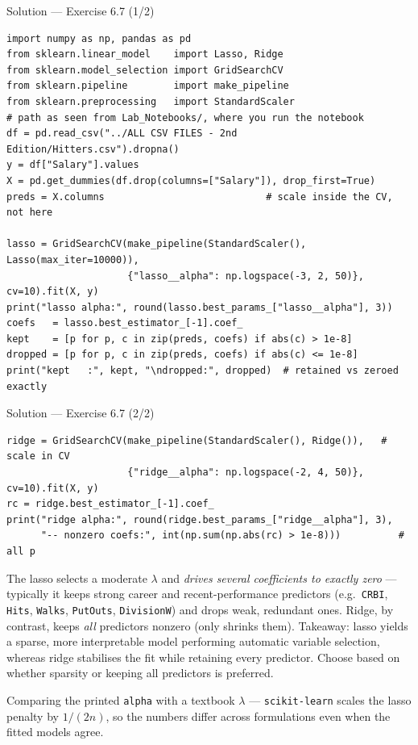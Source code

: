 \documentclass[aspectratio=169,11pt]{beamer}
\begin{document}
\begin{frame}[fragile]{Solution --- Exercise 6.7 (1/2)}
  \begin{lstlisting}
import numpy as np, pandas as pd
from sklearn.linear_model    import Lasso, Ridge
from sklearn.model_selection import GridSearchCV
from sklearn.pipeline        import make_pipeline
from sklearn.preprocessing   import StandardScaler
# path as seen from Lab_Notebooks/, where you run the notebook
df = pd.read_csv("../ALL CSV FILES - 2nd Edition/Hitters.csv").dropna()
y = df["Salary"].values
X = pd.get_dummies(df.drop(columns=["Salary"]), drop_first=True)
preds = X.columns                            # scale inside the CV, not here

lasso = GridSearchCV(make_pipeline(StandardScaler(), Lasso(max_iter=10000)),
                     {"lasso__alpha": np.logspace(-3, 2, 50)}, cv=10).fit(X, y)
print("lasso alpha:", round(lasso.best_params_["lasso__alpha"], 3))
coefs   = lasso.best_estimator_[-1].coef_
kept    = [p for p, c in zip(preds, coefs) if abs(c) > 1e-8]
dropped = [p for p, c in zip(preds, coefs) if abs(c) <= 1e-8]
print("kept   :", kept, "\ndropped:", dropped)  # retained vs zeroed exactly
  \end{lstlisting}
\end{frame}

\begin{frame}[fragile]{Solution --- Exercise 6.7 (2/2)}
  \begin{lstlisting}
ridge = GridSearchCV(make_pipeline(StandardScaler(), Ridge()),   # scale in CV
                     {"ridge__alpha": np.logspace(-2, 4, 50)}, cv=10).fit(X, y)
rc = ridge.best_estimator_[-1].coef_
print("ridge alpha:", round(ridge.best_params_["ridge__alpha"], 3),
      "-- nonzero coefs:", int(np.sum(np.abs(rc) > 1e-8)))          # all p
  \end{lstlisting}
  \begin{solutionbox}
    The lasso selects a moderate $\lambda$ and \emph{drives several
    coefficients to exactly zero} --- typically it keeps strong career
    and recent-performance predictors (e.g.\ \texttt{CRBI},
    \texttt{Hits}, \texttt{Walks}, \texttt{PutOuts},
    \texttt{DivisionW}) and drops weak, redundant ones. Ridge, by
    contrast, keeps \emph{all} predictors nonzero (only shrinks them).
    Takeaway: lasso yields a sparse, more interpretable model performing
    automatic variable selection, whereas ridge stabilises the fit while
    retaining every predictor. Choose based on whether sparsity or
    keeping all predictors is preferred.
  \end{solutionbox}
  \begin{mistake}
    Comparing the printed \texttt{alpha} with a textbook $\lambda$ ---
    \texttt{scikit-learn} scales the lasso penalty by $1/(2n)$, so the
    numbers differ across formulations even when the fitted models agree.
  \end{mistake}
\end{frame}
\end{document}
